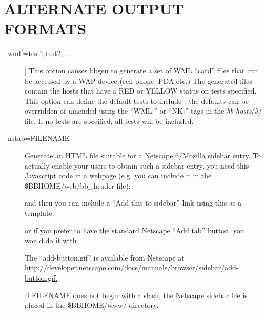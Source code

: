 \section{ALTERNATE OUTPUT FORMATS}


 \begin{description}

\item[--wml[=test1,test2,...]] This option causes bbgen to generate a
  set of WML ``card'' files that can be accessed by a WAP device (cell
  phone, PDA etc.) The generated files contain the hosts that have a
  RED or YELLOW status on tests specified. This option can define the
  default tests to include - the defaults can be overridden or amended
  using the ``WML:'' or ``NK:'' tags in the \emph{bb-hosts(5)}
  file. If no tests are specified, all tests will be included. 


 

\item[--nstab=FILENAME] Generate an HTML file suitable for a Netscape
  6/Mozilla sidebar entry. To actually enable your users to obtain
  such a sidebar entry, you need this Javascript code in a webpage
  (e.g. you can include it in the \$BBHOME/web/bb\_header file): 


% 
% 
% 
% 
% 
%

  and then you can include a ``Add this to sidebar'' link using this as a template: 




  or if you prefer to have the standard Netscape ``Add tab'' button, you would do it with 

%
%  
% 
% 
% 


  The ``add-button.gif'' is available from Netscape at
  \url{http://developer.netscape.com/docs/manuals/browser/sidebar/add-button.gif.}



  If FILENAME does not begin with a slash, the Netscape sidebar file is placed in the \$BBHOME/www/ directory. 



\end{description}
